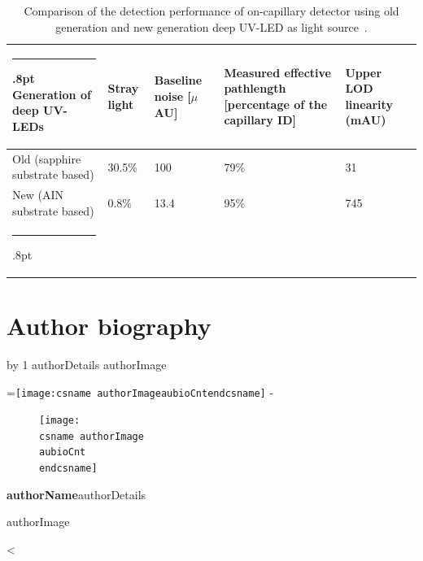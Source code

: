 \documentclass[11pt]{article}
\makeatletter
\newcounter{aubio}
\newcommand{\checkheight}[1]{%
  \par \penalty-100\begingroup%
  \setbox8=\hbox{#1}%
  \setlength{\dimen@}{\ht8}%
  \dimen@ii\pagegoal \advance\dimen@ii-\pagetotal
  \ifdim \dimen@>\dimen@ii
    \break
  \fi\endgroup}
\def\printBio{%
  \@tempcnta=0
   \loop
     \advance \@tempcnta by 1
     \def\aubioCnt{\the\@tempcnta}
     \setlength{\intextsep}{0pt}%
     \setlength{\columnsep}{10pt}%
     \newbox\boxa%
     \setbox\boxa\vbox{\csname authorDetails\aubioCnt\endcsname}
     \expandafter\ifx\csname authorImage\aubioCnt\endcsname\relax%
      \else%
       \checkheight{\texttt{[image: \\csname authorImage\\aubioCnt\\endcsname]}}
        \begin{figure}
         \texttt{[image: \\csname authorImage\\aubioCnt\\endcsname]}%
        \end{figure}\par
      \fi
     {\parindent0pt\textbf{\csname authorName\aubioCnt\endcsname}\csname authorDetails\aubioCnt\endcsname \par\bigskip%
     \expandafter\ifx\csname authorImage\aubioCnt\endcsname\relax\else%
      \ifdim\the\ht\boxa < 90pt\vskip\dimexpr(90pt -\the\ht\boxa-1pc)\fi%
     \fi}%
      \ifnum\@tempcnta < \theaubio
   \repeat
   }
\def\hlinewd#1{%
  \noalign{\ifnum0=`}\fi\hrule \@height #1%
  \futurelet\reserved@a\@xhline}
\def\tbltoprule{\hlinewd{.8pt}}%
\def\tblbottomrule{\hlinewd{.8pt}}
\def\tblmidrule{\hline\noalign{\vspace*{2pt}}}
\makeatother
\begin{document}
\begin{table}[!htbp]
\caption{{Comparison of the detection performance of on-capillary detector using old generation and new generation deep UV-LED as light source\unskip~\protect\cite{693772:16459460}.} }
\label{tw-10fa7620e2c2}
\def\arraystretch{1}
\ignorespaces 
\centering 
\begin{tabulary}{\linewidth}{LLLLL}
\tbltoprule Generation of deep UV-LEDs & Stray light & Baseline noise [\ensuremath{\mu}AU] & Measured effective pathlength [percentage of the capillary ID] & Upper LOD linearity (mAU)\\
\tblmidrule 
Old (sapphire substrate based) &
  30.5\% &
  100 &
  79\% &
  31\\
New (AIN substrate based) &
  0.8\% &
  13.4 &
  95\% &
  745\\
\tblbottomrule 
\end{tabulary}\par 
\end{table}
\clearpage 
    





\section*{Author biography}

\printBio 
\end{document}
